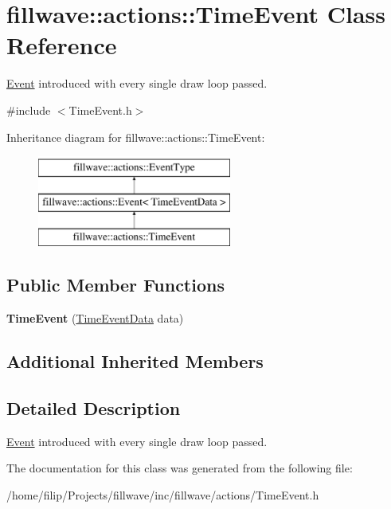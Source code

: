 \hypertarget{classfillwave_1_1actions_1_1TimeEvent}{}\section{fillwave\+:\+:actions\+:\+:Time\+Event Class Reference}
\label{classfillwave_1_1actions_1_1TimeEvent}


\hyperlink{classfillwave_1_1actions_1_1Event}{Event} introduced with every single draw loop passed.  




{\ttfamily \#include $<$Time\+Event.\+h$>$}

Inheritance diagram for fillwave\+:\+:actions\+:\+:Time\+Event\+:\begin{figure}[H]
\begin{center}
\leavevmode
\includegraphics[height=3.000000cm]{classfillwave_1_1actions_1_1TimeEvent}
\end{center}
\end{figure}
\subsection*{Public Member Functions}
\begin{DoxyCompactItemize}
\item 
\hypertarget{classfillwave_1_1actions_1_1TimeEvent_a8af043e06276e89071ff3329148fd82e}{}{\bfseries Time\+Event} (\hyperlink{structfillwave_1_1actions_1_1TimeEventData}{Time\+Event\+Data} data)\label{classfillwave_1_1actions_1_1TimeEvent_a8af043e06276e89071ff3329148fd82e}

\end{DoxyCompactItemize}
\subsection*{Additional Inherited Members}


\subsection{Detailed Description}
\hyperlink{classfillwave_1_1actions_1_1Event}{Event} introduced with every single draw loop passed. 

The documentation for this class was generated from the following file\+:\begin{DoxyCompactItemize}
\item 
/home/filip/\+Projects/fillwave/inc/fillwave/actions/Time\+Event.\+h\end{DoxyCompactItemize}
